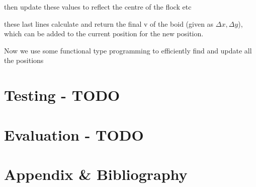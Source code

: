 \documentclass[a4paper, 11pt]{report}
\begin{document}
then update these values to reflect the centre of the flock etc


these last lines calculate and return the final v of the boid (given as $\Delta x, \Delta y$), which can be added to the current position for the new position.


Now we use some functional type programming to efficiently find and update all the positions




\chapter{Testing - TODO}
\chapter{Evaluation - TODO}

\chapter{Appendix \& Bibliography}
\end{document}

